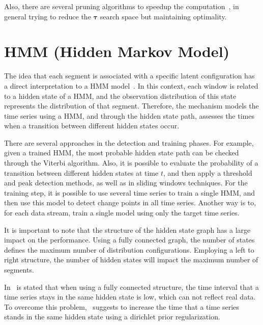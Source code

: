 Also, there are several pruning algorithms to speedup the computation~\cite{optimal_detection_of_changepoints_with_a_linear_computational_cost, on_optimal_multiple_changepoint_algorithms_for_large_data, computationally_efficient_changepoint_detection_for_a_range_of_penalties}, in general trying to reduce the $\boldsymbol \tau$ search space but maintaining optimality.

\section{HMM (Hidden Markov Model)}

The idea that each segment is associated with a specific latent configuration has a direct interpretation to a HMM model~\cite{a_hidden_markov_model_segmentation_procedure_for_hydrological_and_environmental_time_series, fast_estimation_of_posterior_probabilities_in_change-point_analysis_through_a_constrained_hidden_markov_model, inertial_hidden_markov_models_modeling_change_in_multivariate_time_series}. In this context, each window is related to a hidden state of a HMM, and the observation distribution of this state represents the distribution of that segment. Therefore, the mechanism models the time series using a HMM, and through the hidden state path, assesses the times when a transition between different hidden states occur.

There are several approaches in the detection and training phases. For example, given a trained HMM, the most probable hidden state path can be checked through the Viterbi algorithm. Also, it is possible to evaluate the probability of a transition between different hidden states at time $t$, and then apply a threshold and peak detection methods, as well as in sliding windows techniques. For the training step, it is possible to use several time series to train a single HMM, and then use this model to detect change points in all time series. Another way is to, for each data stream, train a single model using only the target time series.

It is important to note that the structure of the hidden state graph has a large impact on the performance. Using a fully connected graph, the number of states defines the maximum number of distribution configurations. Employing a left to right structure, the number of hidden states will impact the maximum number of segments.

In~\cite{inertial_hidden_markov_models_modeling_change_in_multivariate_time_series} is stated that when using a fully connected structure, the time interval that a time series stays in the same hidden state is low, which can not reflect real data. To overcome this problem,~\cite{inertial_hidden_markov_models_modeling_change_in_multivariate_time_series} suggests to increase the time that a time series stands in the same hidden state using a dirichlet prior regularization.


